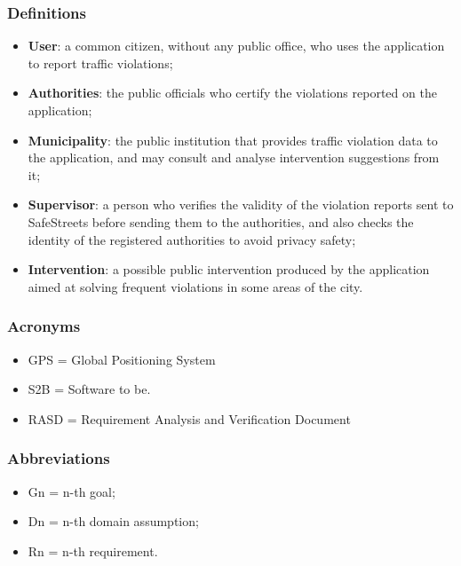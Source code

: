 \subsubsection{Definitions}
	\begin{itemize}
		\item \textbf{User}: a common citizen, without any public office, who uses the application to report traffic violations;
		\item \textbf{Authorities}: the public officials who certify the violations reported on the application;
		\item \textbf{Municipality}: the public institution that provides traffic violation data to the application, and may consult and analyse intervention suggestions from it;
		\item \textbf{Supervisor}: a person who verifies the validity of the violation reports sent to SafeStreets before sending them to the authorities, and also checks the identity of the registered authorities to avoid privacy safety;
		\item \textbf{Intervention}: a possible public intervention produced by the application aimed at solving frequent violations in some areas of the city.
	\end{itemize}
\subsubsection{Acronyms}
\begin{itemize}
	\item GPS = Global Positioning System
	\item S2B = Software to be.
	\item RASD = Requirement Analysis and Verification Document
\end{itemize}
\subsubsection{Abbreviations}
\begin{itemize}
	\item Gn = n-th goal;
	\item Dn = n-th domain assumption;
	\item Rn = n-th requirement.
\end{itemize}